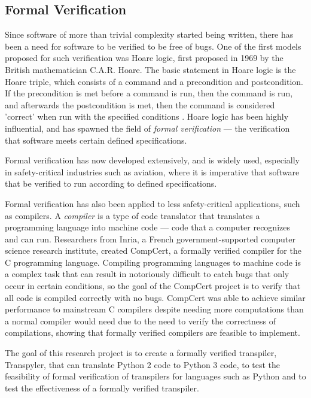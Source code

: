 \subsection{Formal Verification}
Since software of more than trivial complexity started being written, there has been a need for software to be verified to be free of bugs. One of the first models proposed for such verification was Hoare logic, first proposed in 1969 by the British mathematician C.A.R. Hoare. The basic statement in Hoare logic is the Hoare triple, which consists of a command and a precondition and postcondition. If the precondition is met before a command is run, then the command is run, and afterwards the postcondition is met, then the command is considered 'correct' when run with the specified conditions \autocite{Hoare}. Hoare logic has been highly influential, and has spawned the field of \textit{formal verification} --- the verification that software meets certain defined specifications.

Formal verification has now developed extensively, and is widely used, especially in safety-critical industries such as aviation, where it is imperative that software that be verified to run according to defined specifications. 

Formal verification has also been applied to less safety-critical applications, such as compilers. A \textit{compiler} is a type of code translator that translates a programming language into machine code --- code that a computer recognizes and can run. Researchers from Inria, a French government-supported computer science research institute, created CompCert, a formally verified compiler for the C programming language. Compiling programming languages to machine code is a complex task that can result in notoriously difficult to catch bugs that only occur in certain conditions, so the goal of the CompCert project is to verify that all code is compiled correctly with no bugs. CompCert was able to achieve similar performance to mainstream C compilers despite needing more computations than a normal compiler would need due to the need to verify the correctness of compilations, showing that formally verified compilers are feasible to implement.

The goal of this research project is to create a formally verified transpiler, Transpyler, that can translate Python 2 code to Python 3 code, to test the feasibility of formal verification of transpilers for languages such as Python and to test the effectiveness of a formally verified transpiler.